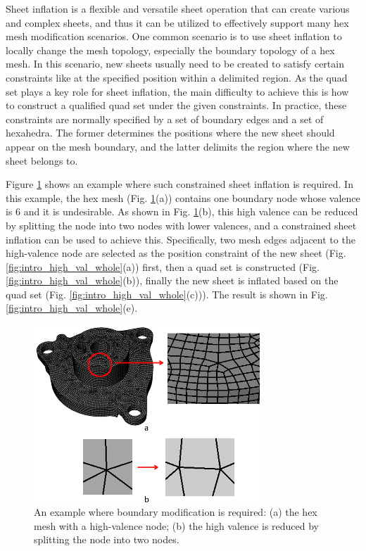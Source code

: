 \documentclass[final,5p,times,twocolumn]{elsarticle}
\begin{document}
Sheet inflation is a flexible and versatile sheet operation that can create various and complex sheets, and thus it can be utilized to effectively support many hex mesh modification scenarios. One common scenario is to use sheet inflation to locally change the mesh topology, especially the boundary topology of a hex mesh. In this scenario, new sheets usually need to be created to satisfy certain constraints like at the specified position within a delimited region. As the quad set plays a key role for sheet inflation, the main difficulty to achieve this is how to construct a qualified quad set under the given constraints. In practice, these constraints are normally specified by a set of boundary edges and a set of hexahedra. The former determines the positions where the new sheet should appear on the mesh boundary, and the latter delimits the region where the new sheet belongs to.

Figure \ref{fig:intro_high_val} shows an example where such constrained sheet inflation is required. In this example, the hex mesh (Fig. \ref{fig:intro_high_val}(a)) contains one boundary node whose valence is 6 and it is undesirable. As shown in Fig. \ref{fig:intro_high_val}(b), this high valence can be reduced by splitting the node into two nodes with lower valences, and a constrained sheet inflation can be used to achieve this. Specifically, two mesh edges adjacent to the high-valence node are selected as the position constraint of the new sheet (Fig. \ref{fig:intro_high_val_whole}(a)) first, then a quad set is constructed (Fig. \ref{fig:intro_high_val_whole}(b)), finally the new sheet is inflated based on the quad set (Fig. \ref{fig:intro_high_val_whole}(c))). The result is shown in Fig. \ref{fig:intro_high_val_whole}(e).

\begin{figure}[htbp]
\begin{center}
\includegraphics[width=8.5cm]{intro_high_val.png}
\caption{An example where boundary modification is required: (a) the hex mesh with a high-valence node; (b) the high valence is reduced by splitting the node into two nodes.}
\label{fig:intro_high_val}
\end{center}
\end{figure}
\end{document}
